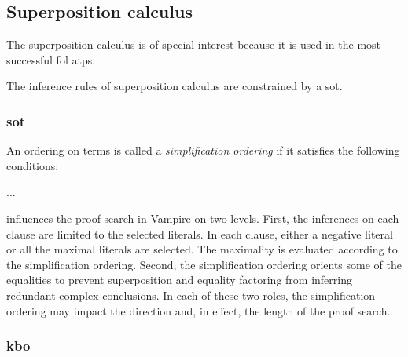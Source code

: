 
\subsection{Superposition calculus}

The superposition calculus is of special interest
because it is used in the most successful \gls{fol} \glspl{atp}.

The inference rules of superposition calculus are constrained by a \gls{sot}.


\subsubsection{\Gls{sot}}

An ordering on terms is called a \emph{simplification ordering} if it satisfies the following conditions:

...

influences the proof search in Vampire on two levels.
First, the inferences on each clause are limited
to the selected literals.
In each clause,
either a negative literal or all the maximal literals are selected.
The maximality is evaluated
according to the simplification ordering.
Second, the simplification ordering orients some of the equalities
to prevent superposition and equality factoring
from inferring redundant complex conclusions.
In each of these two roles,
the simplification ordering may impact the direction and,
in effect, the length of the proof search.

\subsubsection{\Acrfull{kbo}}





